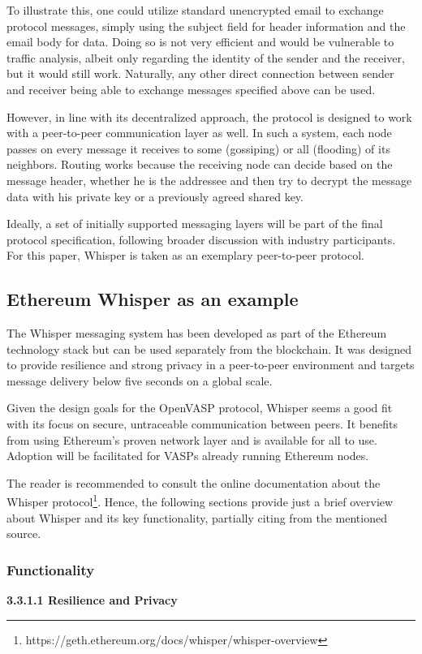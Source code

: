 \documentclass{article}
\begin{document}
To illustrate this, one could utilize standard unencrypted email to exchange protocol messages, simply using the subject field for header information and the email body for data. Doing so is not very efficient and would be vulnerable to traffic analysis, albeit only regarding the identity of the sender and the receiver, but it would still work. Naturally, any other direct connection between sender and receiver being able to exchange messages specified above can be used.

However, in line with its decentralized approach, the protocol is designed to work with a peer-to-peer communication layer as well. In such a system, each node passes on every message it receives to some (gossiping) or all (flooding) of its neighbors. Routing works because the receiving node can decide based on the message header, whether he is the addressee and then try to decrypt the message data with his private key or a previously agreed shared key.

Ideally, a set of initially supported messaging layers will be part of the final protocol specification, following broader discussion with industry participants. For this paper, Whisper is taken as an exemplary peer-to-peer protocol.

\subsection{Ethereum Whisper as an example}

The Whisper messaging system has been developed as part of the Ethereum technology stack but can be used separately from the blockchain. It was designed to provide resilience and strong privacy in a peer-to-peer environment and targets message delivery below five seconds on a global scale.

Given the design goals for the OpenVASP protocol, Whisper seems a good fit with its focus on secure, untraceable communication between peers. It benefits from using Ethereum’s proven network layer and is available for all to use. Adoption will be facilitated for VASPs already running Ethereum nodes.

The reader is recommended to consult the online documentation about the Whisper protocol\footnote{https://geth.ethereum.org/docs/whisper/whisper-overview}. Hence, the following sections provide just a brief overview about Whisper and its key functionality, partially citing from the mentioned source.

\subsubsection{Functionality}
\noindent\normalsize\textbf{3.3.1.1 Resilience and Privacy}
\end{document}
